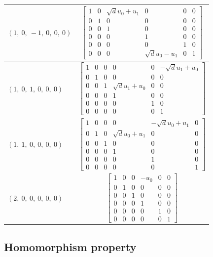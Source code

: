 \documentclass[11pt]{article}
\theoremstyle{definition}
\begin{document}
\begin{longtable}{|l|c|}
    \hline
    $\left( 1, \  0, \  -1, \  0, \  0, \  0\right)$ & ${\left[\begin{matrix}1 & 0 & \sqrt{d} u_{0} + u_{1} & 0 & 0 & 0\\0 & 1 & 0 & 0 & 0 & 0\\0 & 0 & 1 & 0 & 0 & 0\\0 & 0 & 0 & 1 & 0 & 0\\0 & 0 & 0 & 0 & 1 & 0\\0 & 0 & 0 & \sqrt{d} u_{0} - u_{1} & 0 & 1\end{matrix}\right]}$ \\
    \hline
    $\left( 1, \  0, \  1, \  0, \  0, \  0\right)$ & ${\left[\begin{matrix}1 & 0 & 0 & 0 & 0 & - \sqrt{d} u_{1} + u_{0}\\0 & 1 & 0 & 0 & 0 & 0\\0 & 0 & 1 & \sqrt{d} u_{1} + u_{0} & 0 & 0\\0 & 0 & 0 & 1 & 0 & 0\\0 & 0 & 0 & 0 & 1 & 0\\0 & 0 & 0 & 0 & 0 & 1\end{matrix}\right]}$ \\
    \hline
    $\left( 1, \  1, \  0, \  0, \  0, \  0\right)$ & ${\left[\begin{matrix}1 & 0 & 0 & 0 & - \sqrt{d} u_{0} + u_{1} & 0\\0 & 1 & 0 & \sqrt{d} u_{0} + u_{1} & 0 & 0\\0 & 0 & 1 & 0 & 0 & 0\\0 & 0 & 0 & 1 & 0 & 0\\0 & 0 & 0 & 0 & 1 & 0\\0 & 0 & 0 & 0 & 0 & 1\end{matrix}\right]}$ \\
    \hline
    $\left( 2, \  0, \  0, \  0, \  0, \  0\right)$ & ${\left[\begin{matrix}1 & 0 & 0 & - u_{0} & 0 & 0\\0 & 1 & 0 & 0 & 0 & 0\\0 & 0 & 1 & 0 & 0 & 0\\0 & 0 & 0 & 1 & 0 & 0\\0 & 0 & 0 & 0 & 1 & 0\\0 & 0 & 0 & 0 & 0 & 1\end{matrix}\right]}$ \\
    \hline
\end{longtable}


\subsection{Homomorphism property}
\end{document}
